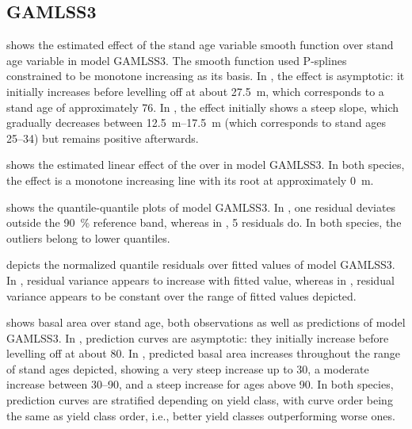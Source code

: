 \subsection{GAMLSS3}

 shows the estimated effect of the stand age variable smooth function over stand age variable in model GAMLSS3.  The smooth function used P-splines constrained to be monotone increasing as its basis.  In \Beech{}, the effect is asymptotic:  it initially increases before levelling off at about \SI{27.5}{\meter}, which corresponds to a stand age of approximately \SI{76}{\year}.  In \Spruce{}, the effect initially shows a steep slope, which gradually decreases between \SIrange{12.5}{17.5}{\meter} (which corresponds to stand ages \SIrange{25}{34}{\year}) but remains positive afterwards.

 shows the estimated linear effect of the \ProductivityIndexVariableText{} over \ProductivityIndexVariableText{} in model GAMLSS3.  In both species, the effect is a monotone increasing line with its root at approximately \SI{0}{\meter}.

 shows the quantile-quantile plots of model GAMLSS3.  In \Beech{}, one residual deviates outside the \SI{90}{\percent} reference band, whereas in \Spruce{}, \num{5} residuals do.  In both species, the outliers belong to lower quantiles.

 depicts the normalized quantile residuals over fitted values of model GAMLSS3.  In \Beech{}, residual variance appears to increase with fitted value, whereas in \Spruce{}, residual variance appears to be constant over the range of fitted values depicted.

 shows basal area over stand age, both observations as well as predictions of model GAMLSS3.  In \Beech{}, prediction curves are asymptotic:  they initially increase before levelling off at about \SI{80}{\year}.  In \Spruce{}, predicted basal area increases throughout the range of stand ages depicted, showing a very steep increase up to \SI{30}{\year}, a moderate increase between \SIrange{30}{90}{\year}, and a steep increase for ages above \SI{90}{\year}.  In both species, prediction curves are stratified depending on yield class, with curve order being the same as yield class order, i.e., better yield classes outperforming worse ones.

